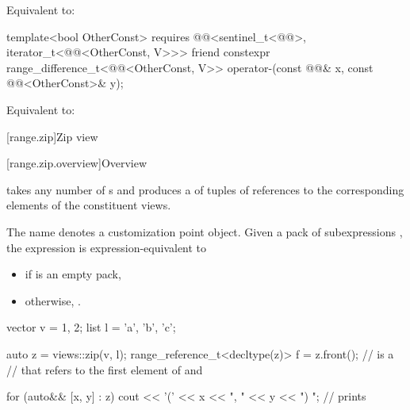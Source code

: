 \begin{itemdescr}
\pnum
\effects
Equivalent to: 
\end{itemdescr}

%
\begin{itemdecl}
template<bool OtherConst>
  requires @@<sentinel_t<@@>, iterator_t<@@<OtherConst, V>>>
friend constexpr range_difference_t<@@<OtherConst, V>>
  operator-(const @@& x, const @@<OtherConst>& y);
\end{itemdecl}

\begin{itemdescr}
\pnum
\effects
Equivalent to: 
\end{itemdescr}

[range.zip]{Zip view}

[range.zip.overview]{Overview}

\pnum
{}%
 takes any number of s and
produces a  of tuples of references
to the corresponding elements of the constituent views.

\pnum
{}%
The name  denotes
a customization point object.
Given a pack of subexpressions ,
the expression  is expression-equivalent to
\begin{itemize}
\item
{}
if  is an empty pack,
\item
otherwise, .
\end{itemize}

\begin{example}
\begin{codeblock}
vector v = {1, 2};
list l = {'a', 'b', 'c'};

auto z = views::zip(v, l);
range_reference_t<decltype(z)> f = z.front();   //  is a 
                                                // that refers to the first element of  and 

for (auto&& [x, y] : z) {
  cout << '(' << x << ", " << y << ") ";        // prints 
}
\end{codeblock}
\end{example}


